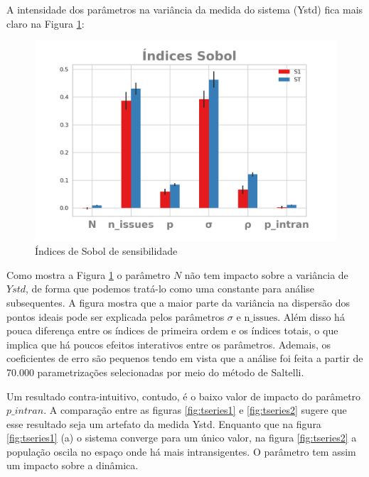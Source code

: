 A intensidade dos parâmetros na variância da medida do sistema (Ystd) fica mais
claro na Figura \ref{fig:sobol1}:

\begin{figure}[H]
  \centering
  \includegraphics{ims/barplotmuto5k.png}
  \caption{Índices de Sobol de sensibilidade}
  \label{fig:sobol1}
\end{figure}

Como mostra a Figura \ref{fig:sobol1} o parâmetro \(N\) não tem impacto sobre a
variância de \(Ystd\), de forma que podemos tratá-lo como uma constante para
análise subsequentes. A figura mostra que a maior parte da variância na
dispersão dos pontos ideais pode ser explicada pelos parâmetros \(\sigma\) e
\(\text{n\_issues}\). Além disso há pouca diferença entre os índices de primeira
ordem e os índices totais, o que implica que há poucos efeitos interativos entre
os parâmetros. Ademais, os coeficientes de erro são pequenos
 tendo em vista que a análise foi feita a
partir de 70.000 parametrizações selecionadas por meio do método de Saltelli.

Um resultado contra-intuitivo, contudo, é o baixo valor de impacto do parâmetro
\(p\_intran\). A comparação entre as figuras \ref{fig:tseries1} e
\ref{fig:tseries2} sugere que esse resultado seja um artefato da medida Ystd.
Enquanto que na figura \ref{fig:tseries1} (a) o sistema converge para um único
valor, na figura \ref{fig:tseries2} a população oscila no espaço onde há mais
intransigentes. O parâmetro tem assim um impacto sobre a dinâmica.

